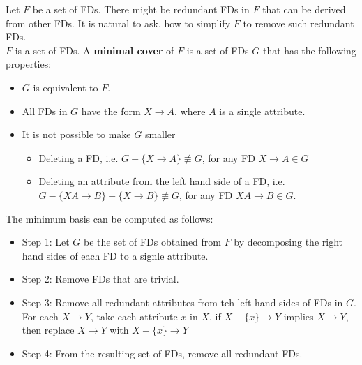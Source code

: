 Let $F$ be a set of FDs. There might be redundant FDs in $F$ that can be derived from other FDs. It is natural to ask, how to simplify $F$ to remove such redundant FDs.\\
$F$ is a set of FDs. A \textbf{minimal cover} of $F$ is a set of FDs $G$ that has the following properties:
\begin{itemize}
\item $G$ is equivalent to $F$.
\item All FDs in $G$ have the form $X \to A$, where $A$ is a single attribute.
\item It is not possible to make $G$ smaller
\begin{itemize}
\item Deleting a FD, i.e. $G - \{X \to A\} \not\equiv G$, for any FD $X \to A \in G$
\item Deleting an attribute from the left hand side of a FD, i.e. $G - \{XA \to B\} + \{X \to B\} \not\equiv G$, for any FD $XA \to B \in G$.
\end{itemize}
\end{itemize}
The minimum basis can be computed as follows:
\begin{itemize}
\item Step 1: Let $G$ be the set of FDs obtained from $F$ by decomposing the right hand sides of each FD to a signle attribute.
\item Step 2: Remove FDs that are trivial.
\item Step 3: Remove all redundant attributes from teh left hand sides of FDs in $G$.\\
For each $X \to Y$, take each attribute $x$ in $X$, if $X - \{x\} \to Y$ implies $X \to Y$, then replace $X\to Y$ with $X - \{x\} \to Y$
\item Step 4: From the resulting set of FDs, remove all redundant FDs.
\end{itemize}

